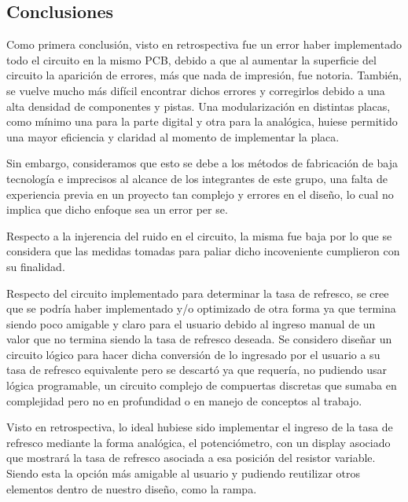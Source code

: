 \subsection{Conclusiones}
Como primera conclusión, visto en retrospectiva fue un error haber implementado todo el circuito en la mismo PCB, debido a que al aumentar la superficie del circuito la aparición de errores, más que nada de impresión, fue notoria. También, se vuelve mucho más difícil encontrar dichos errores y corregirlos debido a una alta densidad de componentes y pistas. Una modularización en distintas placas, como mínimo una para la parte digital y otra para la analógica, huiese permitido una mayor eficiencia y claridad al momento de implementar la placa. \par Sin embargo, consideramos que esto se debe a los métodos de fabricación de baja tecnología e imprecisos al alcance de los integrantes de este grupo, una falta de experiencia previa en un proyecto tan complejo y errores en el diseño, lo cual no implica que dicho enfoque sea un error per se. \par 
Respecto a la injerencia del ruido en el circuito, la misma fue baja por lo que se considera que las medidas tomadas para paliar dicho incoveniente cumplieron con su finalidad. \par 
Respecto del circuito implementado para determinar la tasa de refresco, se cree que se podría haber implementado y/o optimizado de otra forma ya que termina siendo poco amigable y claro para el usuario debido al ingreso manual de un valor que no termina siendo la tasa de refresco deseada. Se considero diseñar un circuito lógico para hacer dicha conversión de lo ingresado por el usuario a su tasa de refresco equivalente pero se descartó ya que requería, no pudiendo usar lógica programable, un circuito complejo de compuertas discretas que sumaba en complejidad pero no en profundidad o en manejo de conceptos al trabajo.\par 
 Visto en retrospectiva, lo ideal hubiese sido implementar el ingreso de la tasa de refresco mediante la forma analógica, el potenciómetro, con un display asociado que mostrará la tasa de refresco asociada a esa posición del resistor variable. Siendo esta la opción más amigable al usuario y pudiendo reutilizar otros elementos dentro de nuestro diseño, como la rampa. \par 
 
